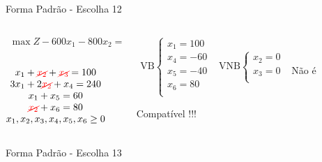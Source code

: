 \begin{frame}
{\begin{block}{Forma Padrão - {\color{cyan}Escolha 12}}
			\begin{columns}
				\begin{column}{0.35\textwidth}
					$
						\begin{matrix}
							\max Z - 600x_1 - 800x_2 = 0 \\
						\end{matrix}
					$ \\
					 \\
					$
						\begin{matrix}
							x_1  + {\color{red}\cancel{x_2}}  + {\color{red}\cancel{x_3}}                   = 100 \\
							3x_1 + 2{\color{red}\cancel{x_2}}       + x_4             = 240 \\
							x_1                     + x_5       = 60 \\
							{\color{red}\cancel{x_2}}                           + x_6 = 80 \\
							x_1,x_2, x_3, x_4, x_5, x_6 \ge 0 \\
						\end{matrix}
					$
				\end{column}
				\vline
				\hspace{0.1cm}
				\begin{column}{0.45\textwidth}
						$
							\begin{matrix}
								\text{VB} \left\{  \begin{matrix}
																 x_1 = 100 \\
																 x_4 = -60 \\
																 x_5 = -40 \\
																 x_6 = 80 \\
												   \end{matrix} 
										   \right.
								&
								\text{VNB} \left\{  \begin{matrix}
																 x_2 = 0 \\
																 x_3 = 0 \\
												   \end{matrix} 
										   \right. 
								\\
							 & \\
							\end{matrix}
						$
						{\color{red}Não é Compatível !!!}
				\end{column}
			\end{columns}
		\end{block}
	}
	{
		\begin{block}{Forma Padrão - {\color{cyan}Escolha 13}}

\end{block}}
\end{frame}
